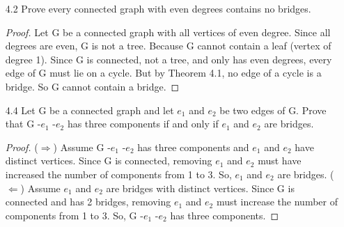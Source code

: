 \documentclass[12pt]{article}
\begin{document}
\begin{enumerate}
\item[4.2] Prove every connected graph with even degrees contains no bridges.
\begin{proof}
    Let G be a connected graph with all vertices of even degree. 
    Since all degrees are even, G is not a tree. Because G cannot contain a leaf (vertex
    of degree 1). Since G is connected, not a tree, and only has even degrees, 
    every edge of G must lie on a cycle. But by Theorem 4.1, no edge of a cycle is a bridge.
    So G cannot contain a bridge.
\end{proof}

 
\item[4.4] Let G be a connected graph and let $e_1$ and $e_2$ be two edges of G.
Prove that G -$e_1$ -$e_2$ has three components if and only if $e_1$ and $e_2$ are bridges.
\begin{proof}
     ($\Rightarrow$) Assume G -$e_1$ -$e_2$ has three components and $e_1$ and $e_2$
        have distinct vertices.
        Since G is connected, removing $e_1$ and $e_2$ must have increased the 
        number of components from 1 to 3. So,  $e_1$ and $e_2$ are bridges.
    \newline
    ($\Leftarrow$) Assume $e_1$ and $e_2$ are bridges with distinct vertices.
        Since G is connected and has 2 bridges, removing $e_1$ and $e_2$ must 
        increase the number of components from 1 to 3. So, G -$e_1$ -$e_2$ has three components.
\end{proof}

\end{enumerate}
\end{document}
